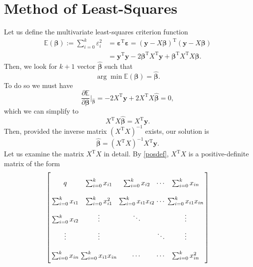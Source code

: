 \documentclass[10pt,a4paper, twocolumn, conference]{IEEEtran}
\theoremstyle{own}
\theoremstyle{definition}
\theoremstyle{plain}
\begin{document}
\section{Method of Least-Squares}
Let us define the multivariate least-squares criterion function
\begin{align} \nonumber
\mathbb{E}(\boldsymbol\beta) := \sum_{i = 0}^k \varepsilon_i^2 & = \boldsymbol\varepsilon^{\text{T}} \boldsymbol\varepsilon = (\mathbf{y} - X \boldsymbol\beta)^{\text{T}} (\mathbf{y} - X \boldsymbol\beta) \\
& = \mathbf{y}^{\text{T}}\mathbf{y} - 2\boldsymbol\beta^{\text{T}}X^{\text{T}}\mathbf{y} + \boldsymbol\beta^{\text{T}}X^{\text{T}} X\boldsymbol\beta.
\end{align}
Then, we look for $k+1$ vector $\hat{\boldsymbol\beta}$ such that
\begin{equation}
\arg \min \mathbb{E} (\boldsymbol\beta) = \hat{\boldsymbol\beta}.
\end{equation}
To do so we must have
\begin{equation}
\frac{\partial \mathbb{E}}{\partial \boldsymbol\beta} \Big|_{\hat{\boldsymbol\beta}} = -2X^{\text{T}}\mathbf{y} + 2 X^{\text{T}} X \hat{\boldsymbol\beta} =  0,
\end{equation}
which we can simplify to
\begin{equation}
X^{\text{T}} X \hat{\boldsymbol\beta} = X^{\text{T}}\mathbf{y}.
\end{equation}
Then, provided the inverse matrix $(X^{\text{T}} X)^{-1}$ exists, our solution is
\begin{equation}
\hat{\boldsymbol\beta} = (X^{\text{T}} X)^{-1} X^{\text{T}}\mathbf{y}.
\end{equation}
Let us examine the matrix $X^{\text{T}} X$ in detail. By \cref{posdef}, $X^{\text{T}} X$ is a positive-definite matrix of the form
\begin{equation*} \arraycolsep=1.4pt\def\arraystretch{2.2}
\left[ \begin{array}{ccccc} q & \sum_{i = 0}^k x_{i1} & \sum_{i = 0}^k x_{i2} & \cdots & \sum_{i = 0}^k x_{in} \\
             \sum_{i = 0}^k x_{i1} & \sum_{i = 0}^k x_{i1}^2 & \sum_{i = 0}^k x_{i1}x_{i2} & \cdots & \sum_{i = 0}^k x_{i1}x_{in} \\
             \sum_{i = 0}^k x_{i2} & \vdots & \ddots & & \vdots\\
             \vdots				   & \vdots &  & \ddots & \vdots \\
             \sum_{i = 0}^k x_{in} & \sum_{i = 0}^k x_{i1}x_{in}  & \cdots & \cdots & \sum_{i = 0}^k x_{in}^2

\end{array} \right]
\end{equation*}
\end{document}

